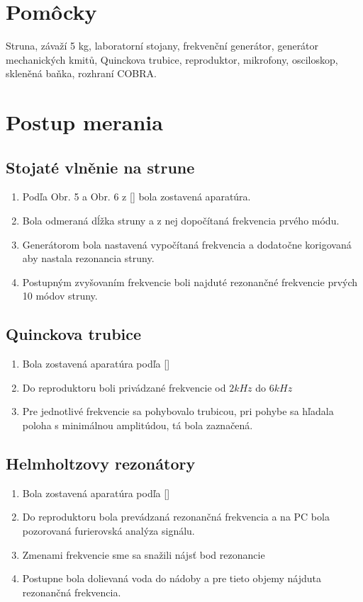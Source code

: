 \documentclass[10pt]{scrartcl}
\begin{document}
\MakeFJFIHead{}






\section{Pomôcky}
Struna, závaží 5 kg, laboratorní stojany, frekvenční generátor, generátor mechanických kmitů,
Quinckova trubice, reproduktor, mikrofony, osciloskop, skleněná baňka, rozhraní COBRA.



\section{Postup merania}
\subsection{Stojaté vlněnie na strune}
\begin{enumerate}
\item Podľa Obr. 5 a Obr. 6 z [\cite{C_1}] bola zostavená aparatúra.
\item Bola odmeraná dĺžka struny a z nej dopočítaná frekvencia prvého módu.
\item Generátorom bola nastavená vypočítaná frekvencia a dodatočne korigovaná aby nastala rezonancia struny.
\item Postupným zvyšovaním frekvencie boli najduté rezonančné frekvencie prvých 10 módov struny. 
\end{enumerate}

\subsection{Quinckova trubice}
\begin{enumerate}
\item Bola zostavená aparatúra podľa [\cite{C_1}]
\item Do reproduktoru boli privádzané frekvencie od $2kHz$ do $6kHz$
\item Pre jednotlivé frekvencie sa pohybovalo trubicou, pri pohybe sa hľadala poloha s minimálnou amplitúdou, tá bola zaznačená.
\end{enumerate}

\subsection{Helmholtzovy rezonátory}
\begin{enumerate}
\item Bola zostavená aparatúra podľa [\cite{C_1}]
\item Do reproduktoru bola prevádzaná rezonančná frekvencia a na PC bola pozorovaná furierovská analýza signálu.
\item Zmenami frekvencie sme sa snažili nájsť bod rezonancie
\item Postupne bola dolievaná voda do nádoby a pre tieto objemy nájduta rezonančná frekvencia.
\end{enumerate}
\end{document}
